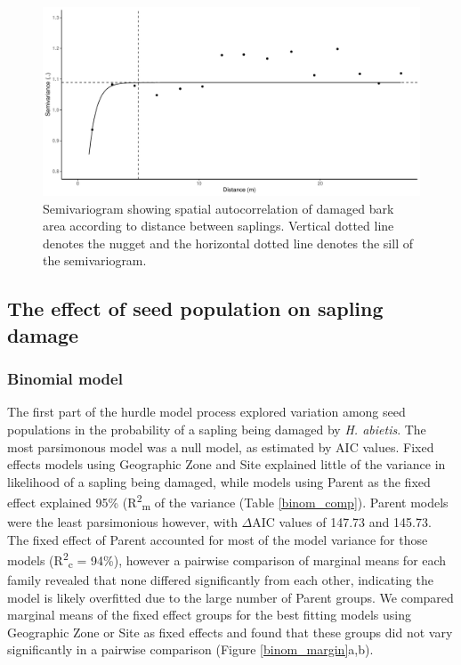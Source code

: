 \documentclass[a4paper, 11pt]{article}
\newcommand{\textapprox}{\raisebox{0.5ex}{\texttildelow}}
\begin{document}
\begin{figure}[H]
	\includegraphics[width=\textwidth]{variogram}
	\caption{Semivariogram showing spatial autocorrelation of damaged bark area according to distance between saplings. Vertical dotted line denotes the nugget and the horizontal dotted line denotes the sill of the semivariogram.}
	\label{semivariogram}
\end{figure}



\subsection*{The effect of seed population on sapling damage}

\subsubsection*{Binomial model}

The first part of the hurdle model process explored variation among seed populations in the probability of a sapling being damaged by \textit{H. abietis}. The most parsimonous model was a null model, as estimated by AIC values. Fixed effects models using Geographic Zone and Site explained little of the variance in likelihood of a sapling being damaged, while models using Parent as the fixed effect explained \textapprox{}95\% (R\textsuperscript{2}\textsubscript{m} of the variance (Table \ref{binom_comp}). Parent models were the least parsimonious however, with $\Delta$AIC values of 147.73 and 145.73. The fixed effect of Parent accounted for most of the model variance for those models (R\textsuperscript{2}\textsubscript{c} = \textapprox{}94\%), however a pairwise comparison of marginal means for each family revealed that none differed significantly from each other, indicating the model is likely overfitted due to the large number of Parent groups. We compared marginal means of the fixed effect groups for the best fitting models using Geographic Zone or Site as fixed effects and found that these groups did not vary significantly in a pairwise comparison (Figure \ref{binom_margin}a,b).
\end{document}
